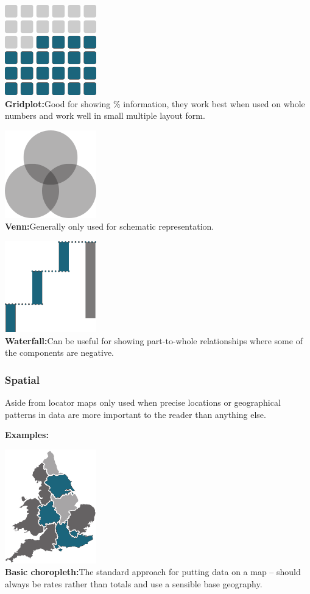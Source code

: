 \documentclass[
  a4paper,
  onecolumn,
  oneside]{book}
\begin{document}
\includegraphics{part1/images/parttowhole4.png}\\
\textbf{Gridplot:}Good for showing \% information, they work best when
used on whole numbers and work well in small multiple layout form.

\includegraphics{part1/images/parttowhole5.png}\\
\textbf{Venn:}Generally only used for schematic representation.

\includegraphics{part1/images/parttowhole6.png}\\
\textbf{Waterfall:}Can be useful for showing part-to-whole relationships
where some of the components are negative.

\hypertarget{spatial}{%
\subsubsection{Spatial}\label{spatial}}

Aside from locator maps only used when precise locations or geographical
patterns in data are more important to the reader than anything else.

\textbf{Examples:}

\includegraphics{part1/images/spatial1.png}\\
\textbf{Basic choropleth:}The standard approach for putting data on a
map -- should always be rates rather than totals and use a sensible base
geography.
\end{document}
